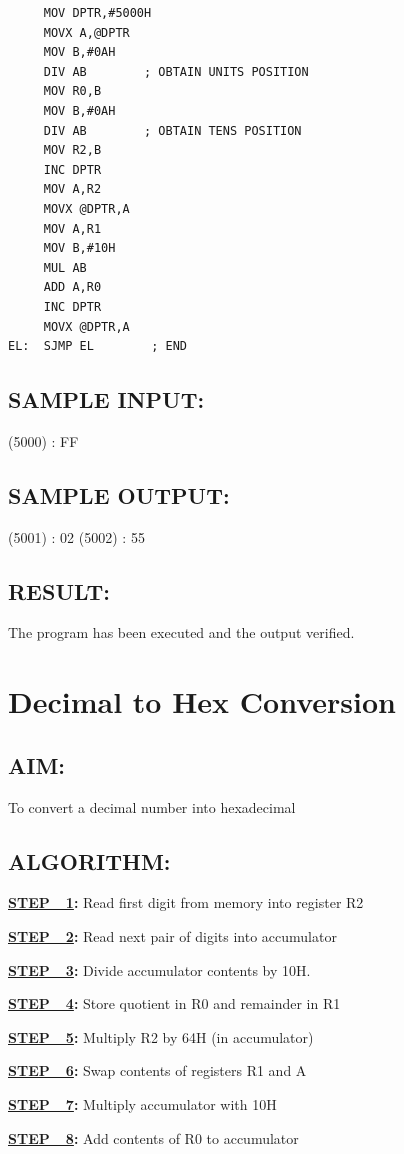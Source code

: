 \documentclass[a4paper,28pt]{report}
\begin{document}
\begin{lstlisting}
     MOV DPTR,#5000H
     MOVX A,@DPTR
     MOV B,#0AH
     DIV AB        ; OBTAIN UNITS POSITION
     MOV R0,B
     MOV B,#0AH
     DIV AB        ; OBTAIN TENS POSITION
     MOV R2,B
     INC DPTR
     MOV A,R2
     MOVX @DPTR,A
     MOV A,R1
     MOV B,#10H
     MUL AB
     ADD A,R0
     INC DPTR
     MOVX @DPTR,A
EL:  SJMP EL        ; END
\end{lstlisting}
\section*{SAMPLE INPUT:}
(5000) : FF
\section*{SAMPLE OUTPUT:}
(5001) : 02
(5002) : 55
\section*{RESULT:}
The program has been executed and the output verified.
\chapter{Decimal to Hex Conversion}
\section*{AIM:}
To convert a decimal number into hexadecimal

\section*{ALGORITHM:}

\textbf{\underline{STEP\ \ 1}:} Read first digit from memory into register R2

\textbf{\underline{STEP\ \ 2}:} Read next pair of digits into accumulator

\textbf{\underline{STEP\ \ 3}:} Divide accumulator contents by 10H.

\textbf{\underline{STEP\ \ 4}:} Store quotient in R0 and remainder in R1

\textbf{\underline{STEP\ \ 5}:} Multiply R2 by 64H (in accumulator)

\textbf{\underline{STEP\ \ 6}:} Swap contents of registers R1 and A

\textbf{\underline{STEP\ \ 7}:} Multiply accumulator with 10H

\textbf{\underline{STEP\ \ 8}:} Add contents of R0 to accumulator
\end{document}
